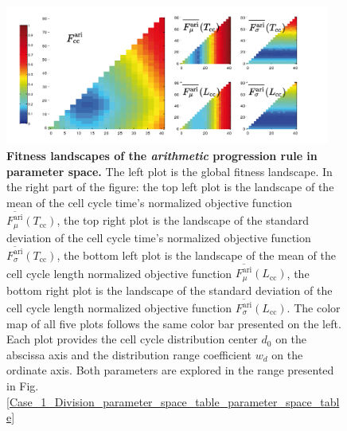 \begin{figure}
\begin{center}
\includegraphics[width=0.95\textwidth]{../../images/Cases_Studies/Case_1_Division/071222bF_t_selection_1_all_T_121224_fitness_ari_ok.png}
\end{center}
\caption{\textbf{Fitness landscapes of the \textit{arithmetic} progression rule in parameter space.} The left plot is the global fitness landscape. In the right part of the figure: the top left plot is the landscape of the mean of the cell cycle time's normalized objective function $\overline{F^{\mathrm{ari}}_{\mu}}(T_{\mathrm{cc}})$, the top right plot is the landscape of the standard deviation of the cell cycle time's normalized objective function $\overline{F^{\mathrm{ari}}_{\sigma}}(T_{\mathrm{cc}})$, the bottom left plot is the landscape of the mean of the cell cycle length normalized objective function $\overline{F^{\mathrm{ari}}_{\mu}}(L_{\mathrm{cc}})$, the bottom right plot is the landscape of the standard deviation of the cell cycle length normalized objective function $\overline{F^{\mathrm{ari}}_{\sigma}}(L_{\mathrm{cc}})$. The color map of all five plots follows the same color bar presented on the left. Each plot provides the cell cycle distribution center $d_0$ on the abscissa axis and the distribution range coefficient $w_d$ on the ordinate axis. Both parameters are explored in the range presented in Fig. \ref{Case_1_Division_parameter_space_table_parameter_space_table}}
\label{071222bF_t_selection_1_all_T_121224_fitness_ari_ok}
\end{figure}
